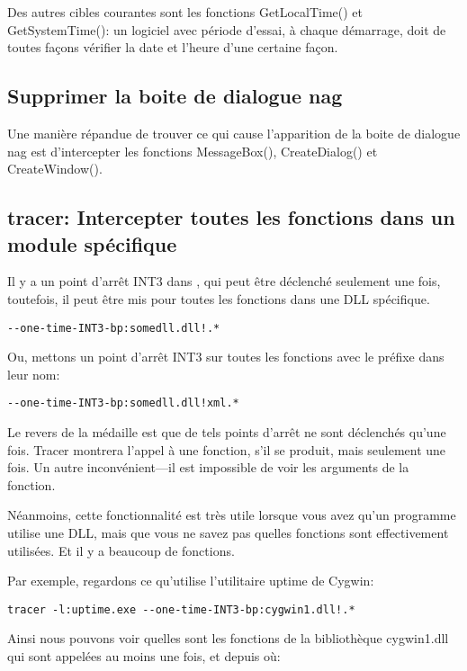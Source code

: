 Des autres cibles courantes sont les fonctions GetLocalTime() et GetSystemTime():
un logiciel avec période d'essai, à chaque démarrage, doit de toutes façons vérifier
la date et l'heure d'une certaine façon.

\subsection{Supprimer la boite de dialogue nag}

Une manière répandue de trouver ce qui cause l'apparition de la boite de dialogue
nag est d'intercepter les fonctions MessageBox(), CreateDialog() et CreateWindow().

\subsection{tracer: Intercepter toutes les fonctions dans un module spécifique}

Il y a un point d'arrêt INT3 dans \tracer, qui peut être déclenché seulement une
fois, toutefois, il peut être mis pour toutes les fonctions dans une DLL spécifique.

\begin{lstlisting}
--one-time-INT3-bp:somedll.dll!.*
\end{lstlisting}

Ou, mettons un point d'arrêt INT3 sur toutes les fonctions avec le préfixe 
dans leur nom:

\begin{lstlisting}
--one-time-INT3-bp:somedll.dll!xml.*
\end{lstlisting}

Le revers de la médaille est que de tels points d'arrêt ne sont déclenchés qu'une fois.
Tracer montrera l'appel à une fonction, s'il se produit, mais seulement une fois.
Un autre inconvénient---il est impossible de voir les arguments de la fonction.

Néanmoins, cette fonctionnalité est très utile lorsque vous avez qu'un programme
utilise une DLL, mais que vous ne savez pas quelles fonctions sont effectivement
utilisées.
Et il y a beaucoup de fonctions.

\par
{}
Par exemple, regardons ce qu'utilise l'utilitaire uptime de Cygwin:

\begin{lstlisting}
tracer -l:uptime.exe --one-time-INT3-bp:cygwin1.dll!.*
\end{lstlisting}

Ainsi nous pouvons voir quelles sont les fonctions de la bibliothèque cygwin1.dll
qui sont appelées au moins une fois, et depuis où:



